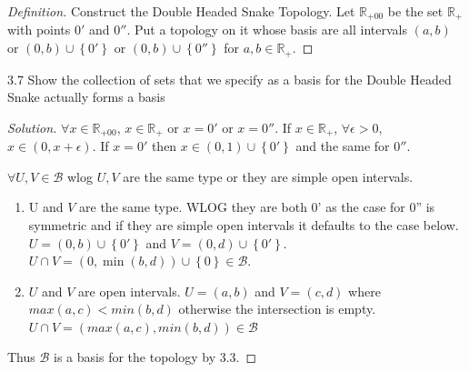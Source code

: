\documentclass{article}
\newcommand*{\B}{\mathcal{B}}
\newcommand{\R}{\mathbb{R}}
\newenvironment{solution}
{\renewcommand\qedsymbol{$\blacksquare$}\begin{proof}[Solution]}
{\end{proof}}
\newenvironment{definition}
{\renewcommand\qedsymbol{$\blacksquare$}\begin{proof}[Definition]}
{\end{proof}}
\begin{document}
\bigskip

\begin{definition}
    Construct the Double Headed Snake Topology. Let $\R_{+00}$ be the set $\R_{+}$ with points $0'$ and $0''$. Put a topology on it whose basis are all intervals $(a, b)$ or $(0, b) \cup \left\{ 0' \right\}$ or $(0, b) \cup \left\{ 0'' \right\}$ for $a, b \in \R_+$.         
\end{definition}

\bigskip

\begin{PROB}{3.7}\label{Problem 3.7.}
    Show the collection of sets that we specify as a basis for the Double Headed Snake actually forms a basis
\end{PROB}
\begin{solution}
    $\forall x \in \R_{+ 0 0}$, $x \in \R_{+}$ or $x = 0'$ or $x = 0''$. If $x \in \R_{+}$, $\forall \epsilon > 0$, $x \in (0, x + \epsilon)$. If $x = 0'$ then $x \in (0, 1) \cup \left\{ 0' \right\}$ and the same for $0''$. 
    
    $\forall U, V \in \B$ wlog $U, V$ are the same type or they are simple open intervals. 
    
    \begin{enumerate}
        \item U and $V$ are the same type. WLOG they are both 0' as the case for 0'' is symmetric and if they are simple open intervals it defaults to the case below. $U = (0, b) \cup \left\{ 0' \right\}$ and $V = (0, d) \cup \left\{ 0' \right\}$. $U \cap V = (0, \min(b, d)) \cup \left\{ 0 \right\} \in \B$. 
        \item $U$ and $V$ are open intervals. $U = (a, b)$ and $V = (c, d)$ where $max(a, c) < min(b, d)$ otherwise the intersection is empty. $U \cap V = (max(a, c), min(b, d))\in \B$        
    \end{enumerate}

    Thus $\B$ is a basis for the topology by 3.3. 
\end{solution}

\bigskip
\end{document}
